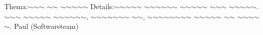 
%
{Thema:}{$\sim$$\sim$$\sim$ $\sim$$\sim$ $\sim$$\sim$$\sim$$\sim$$\sim$}%
{Details:}{$\sim$$\sim$$\sim$$\sim$$\sim$ $\sim$$\sim$$\sim$$\sim$$\sim$$\sim$ $\sim$$\sim$$\sim$$\sim$$\sim$ $\sim$$\sim$$\sim$ $\sim$$\sim$$\sim$$\sim$$\sim$. $\sim$$\sim$$\sim$ $\sim$$\sim$$\sim$$\sim$$\sim$ $\sim$$\sim$$\sim$$\sim$$\sim$$\sim$, $\sim$$\sim$$\sim$$\sim$$\sim$$\sim$$\sim$ $\sim$$\sim$, $\sim$$\sim$$\sim$$\sim$$\sim$$\sim$$\sim$$\sim$ $\sim$$\sim$$\sim$$\sim$$\sim$ $\sim$$\sim$ $\sim$$\sim$$\sim$$\sim$$\sim$.}
{Paul (Softwareteam)}
